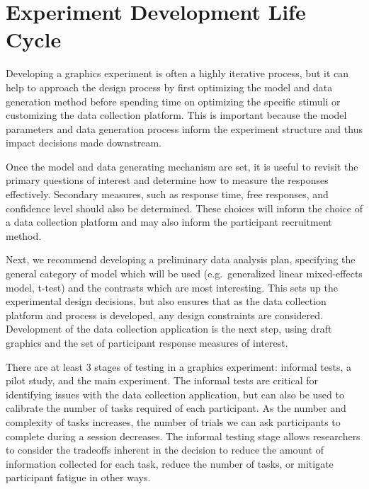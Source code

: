 \documentclass[
  10pt,
  letterpaper,
  DIV=11,
  numbers=noendperiod]{scrartcl}
\begin{document}
\section{Experiment Development Life
Cycle}\label{experiment-development-life-cycle}

Developing a graphics experiment is often a highly iterative process,
but it can help to approach the design process by first optimizing the
model and data generation method before spending time on optimizing the
specific stimuli or customizing the data collection platform. This is
important because the model parameters and data generation process
inform the experiment structure and thus impact decisions made
downstream.

Once the model and data generating mechanism are set, it is useful to
revisit the primary questions of interest and determine how to measure
the responses effectively. Secondary measures, such as response time,
free responses, and confidence level should also be determined. These
choices will inform the choice of a data collection platform and may
also inform the participant recruitment method.

Next, we recommend developing a preliminary data analysis plan,
specifying the general category of model which will be used
(e.g.~generalized linear mixed-effects model, t-test) and the contrasts
which are most interesting. This sets up the experimental design
decisions, but also ensures that as the data collection platform and
process is developed, any design constraints are considered. Development
of the data collection application is the next step, using draft
graphics and the set of participant response measures of interest.

There are at least 3 stages of testing in a graphics experiment:
informal tests, a pilot study, and the main experiment. The informal
tests are critical for identifying issues with the data collection
application, but can also be used to calibrate the number of tasks
required of each participant. As the number and complexity of tasks
increases, the number of trials we can ask participants to complete
during a session decreases. The informal testing stage allows
researchers to consider the tradeoffs inherent in the decision to reduce
the amount of information collected for each task, reduce the number of
tasks, or mitigate participant fatigue in other ways.
\end{document}
